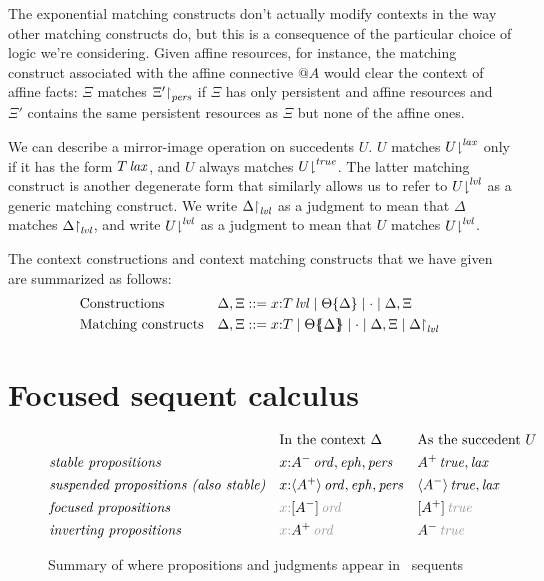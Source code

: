 The exponential matching constructs 
don't actually modify contexts in the way
other matching constructs do, but this is a consequence of the 
particular choice of logic we're considering. Given affine resources,
for instance, the matching construct associated with the 
affine connective ${@}A$ would
clear the context of affine facts: 
$\Xi$ matches ${\Xi'}{\upharpoonright}_{{\it pers}}$ if 
$\Xi$ has only persistent and affine resources and $\Xi'$ 
contains the same persistent resources as $\Xi$ but none of the affine ones.

We can describe a mirror-image operation on succedents $U$.  $U$
matches ${U}{\downharpoonright}^{{\it lax}}$ only if it has the form ${T}\,{{\it lax}}$,
and $U$ always matches ${U}{\downharpoonright}^{{\it true}}$. The latter matching
construct is another degenerate form that similarly allows us to refer
to ${U}{\downharpoonright}^{{\it lvl}}$ as a generic matching construct. We write
${\Delta}{\upharpoonright}_{{\it lvl}}$ as a judgment to mean that 
$\Delta$ matches ${\Delta}{\upharpoonright}_{{\it lvl}}$, 
and write ${U}{\downharpoonright}^{{\it lvl}}$
as a judgment to mean that $U$ matches ${U}{\downharpoonright}^{{\it lvl}}$.

The context constructions and context matching constructs
that we have given are summarized as follows:
\begin{align*}
& \mbox{Constructions} & 
\Delta, \Xi & ::= x{:}{T}\,{{\it lvl}} \mid {\Theta}\{{\Delta}\} \mid 
  \cdot \mid \Delta, \Xi
\\
\qquad\qquad & \mbox{Matching constructs} &
\Delta, \Xi & ::= x{:}T \mid {\Theta}\mbox{$\{\hspace{-4pt}\{$}{\Delta}\mbox{$\}\hspace{-4pt}\}$} \mid \cdot \mid
  \Delta, \Xi \mid {\Delta}{\upharpoonright}_{{\it lvl}} \qquad\qquad
\end{align*}

\section{Focused sequent calculus}
\label{sec:ord-focused}

\begin{figure}
\begin{align*}
&
 & & \mbox{In the context $\Delta$}
 & & \mbox{As the succedent $U$}
\\
& \mbox{\it stable propositions}
 & & x{:}\istrue{A^-}, \meph, \mpers
 & & \isconc{A^+}, \mlax
\\
& \mbox{\it suspended propositions (also stable)}
 & & x{:}\istrue{\susp{A^+}}, \meph, \mpers
 & & \isconc{\susp{A^-}}, \mlax
\\
& \mbox{\it focused propositions}
 & & \textcolor{grayout}{x{:}\istrue{\no{[A^-]}}}
 & & \textcolor{grayout}{\isconc{\no{[A^+]}}}
\\
& \mbox{\it inverting propositions}
 & & \textcolor{grayout}{x{:}\istrue{\no{A^+}}}
 & & \textcolor{grayout}{\isconc{\no{A^-}}}
\end{align*}
\caption{Summary of where propositions and judgments appear in \ollll~sequents}
\label{fig:where-do-they-go}
\end{figure}

